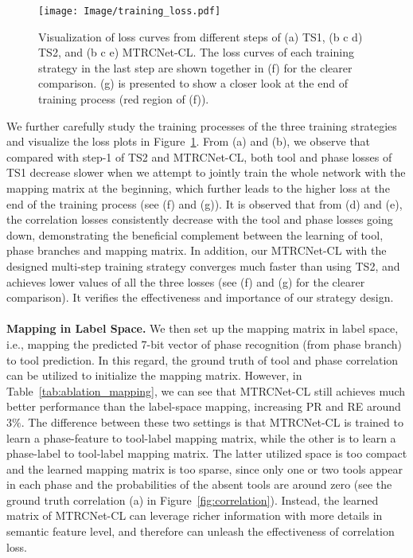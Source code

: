 \documentclass{elsarticle}
\begin{document}
\begin{figure}[t]
	\color{blue}
	\centering
	\texttt{[image: Image/training\_loss.pdf]}
	\caption{
		Visualization of loss curves from different steps of (a) TS1, (b c d) TS2, and (b c e) MTRCNet-CL. The loss curves of each training strategy in the last step are shown together in (f) for the clearer comparison. (g) is presented to show a closer look at the end of training process (red region of (f)). }
	\label{fig:loss}
\end{figure}
We further carefully study the training processes of the three training strategies and visualize the loss plots in Figure~\ref{fig:loss}.
From (a) and (b), we observe that compared with step-1 of TS2 and MTRCNet-CL, both tool and phase losses of TS1 decrease slower when we attempt to jointly train the whole network with the mapping matrix at the beginning, which further leads to the higher loss at the end of the training process (see (f) and (g)). 
It is observed that from (d) and (e), the correlation losses consistently decrease with the tool and phase losses going down, demonstrating the beneficial complement between the learning of tool, phase branches and mapping matrix. 
In addition, our MTRCNet-CL with the designed multi-step training strategy converges much faster than using TS2, and achieves lower values of all the three losses (see (f) and (g) for the clearer comparison). It verifies the effectiveness and importance of our strategy design.
\\
\\
\textbf{Mapping in Label Space.}
We then set up the mapping matrix in label space, i.e., mapping the predicted 7-bit vector of phase recognition (from phase branch) to tool prediction.
In this regard, the ground truth of tool and phase correlation can be utilized to initialize the mapping matrix.
However, in Table~\ref{tab:ablation_mapping}, we can see that MTRCNet-CL still achieves much better performance than the label-space mapping, increasing PR and RE around $3\%$.
The difference between these two settings is that MTRCNet-CL is trained to learn a phase-feature to tool-label mapping matrix, while the other is to learn a phase-label to tool-label mapping matrix.
The latter utilized space is too compact and the learned mapping matrix is too sparse, since only one or two tools appear in each phase and the probabilities of the absent tools are around zero (see the ground truth correlation (a) in Figure~\ref{fig:correlation}).
Instead, the learned matrix of MTRCNet-CL can leverage richer information with more details in semantic feature level, and therefore can unleash the effectiveness of correlation loss.
\end{document}

